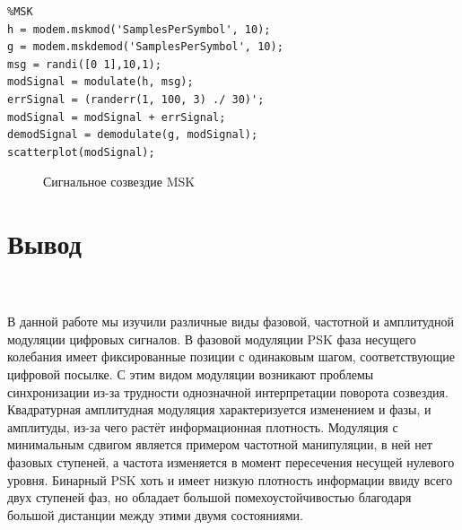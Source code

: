 \documentclass[10pt,a4paper,oneside]{article}
\begin{document}
\newpage
\begin{verbatim}
%MSK
h = modem.mskmod('SamplesPerSymbol', 10);
g = modem.mskdemod('SamplesPerSymbol', 10);
msg = randi([0 1],10,1);
modSignal = modulate(h, msg);
errSignal = (randerr(1, 100, 3) ./ 30)';
modSignal = modSignal + errSignal;
demodSignal = demodulate(g, modSignal);
scatterplot(modSignal);
\end{verbatim}
\begin{figure}[h]
	\caption{Сигнальное созвездие MSK}
\end{figure}


\section{Вывод\\\\}
В данной работе мы изучили различные виды фазовой, частотной и амплитудной модуляции цифровых сигналов.
В фазовой модуляции PSK фаза несущего колебания имеет фиксированные позиции с одинаковым шагом, соответствующие цифровой посылке. С этим видом модуляции возникают проблемы синхронизации из-за трудности однозначной интерпретации поворота созвездия.
Квадратурная амплитудная модуляция характеризуется изменением и фазы, и амплитуды, из-за чего растёт информационная плотность.
Модуляция с минимальным сдвигом является примером частотной манипуляции, в ней нет фазовых ступеней, а частота изменяется в момент пересечения несущей нулевого уровня. Бинарный PSK хоть и имеет низкую плотность информации ввиду всего двух ступеней фаз, но обладает большой помехоустойчивостью благодаря большой дистанции между этими двумя состояниями.
\end{document}
